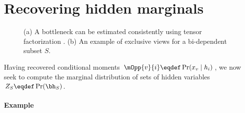 \section{Recovering hidden marginals}
\label{sec:hiddenMarginals}

\begin{figure}
  \centering
  \hspace{2em}
  \caption{(a) A bottleneck can be estimated consistently
  using tensor factorization \citep{anandkumar13tensor}.
  (b) An example of exclusive views for a bi-dependent subset $S$.
  }
\end{figure}

Having recovered conditional moments $\mOpp{v}{i} \eqdef \Pr(x_v \mid h_i)$,
we now seek to compute the marginal distribution of sets of hidden variables
$Z_S \eqdef \Pr(\bh_S)$.


\paragraph{Example}

